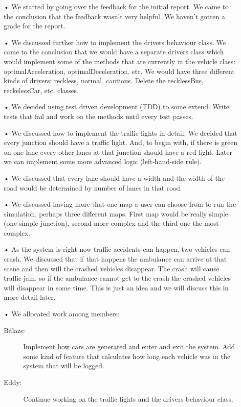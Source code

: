 \documentclass[11pt]{article}
\begin{document}
\begin{itemize}
\item[•] We started by going over the feedback for the initial report. We came to the conclusion that the feedback wasn't very helpful. We haven't gotten a grade for the report.
\item[•] We discussed further how to implement the drivers behaviour class. We came to the conclusion that we would have a separate drivers class which would implement some of the methods that are currently in the vehicle class: optimalAcceleration, optimalDeceleration, etc. We would have three different kinds of drivers: reckless, normal, cautious. Delete the recklessBus, reckelessCar, etc. classes.
\item[•] We decided using test driven development (TDD) to some extend. Write tests that fail and work on the methods until every test passes.
\item[•] We discussed how to implement the traffic lights in detail. We decided that every junction should have a traffic light. And, to begin with, if there is green on one lane every other lanes at that junction should have a red light. Later we can implement some more advanced logic (left-hand-side rule).
\item[•] We discussed that every lane should have a width and the width of the road would be determined by number of lanes in that road.
\item[•] We discussed having more that one map a user can choose from to run the simulation, perhaps three different maps. First map would be really simple (one simple junction), second more complex and the third one the most complex.
\item[•] As the system is right now traffic accidents can happen, two vehicles can crash. We discussed that if that happens the ambulance can arrive at that scene and then will the crashed vehicles disappear. The crash will cause traffic jam, so if the ambulance cannot get to the crash the crashed vehicles will disappear in some time. This is just an idea and we will discuss this in more detail later.
\item[•] We allocated work among members:
	\begin{description}
	\item[Bálazs: ]Implement how cars are generated and enter and exit the system. Add some kind of feature that calculates how long each vehicle was in the system that will be logged.
	\item[Eddy: ]Continue working on the traffic lights and the drivers behaviour class.

\end{description}
\end{itemize}
\end{document}
